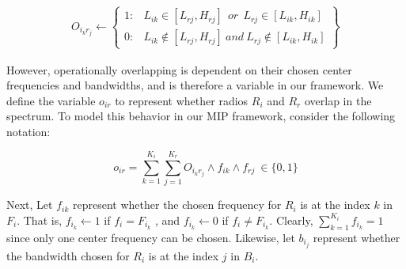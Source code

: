 
\vspace{-0.1in}
\begin{equation}
\begin{split}
O_{i_kr_j} \leftarrow 
\begin{Bmatrix}
1:& L_{ik} \in [L_{rj}, H_{rj}]~~or~~L_{rj} \in [L_{ik}, H_{ik}] \\
0:&  L_{ik} \notin [L_{rj}, H_{rj}]~and~L_{rj} \notin [L_{ik}, H_{ik}] 
\end{Bmatrix}
\end{split}
\end{equation}

However, operationally overlapping is dependent on their chosen center frequencies and bandwidths, and is therefore a variable in our framework. We define the variable $o_{ir}$ to represent whether radios $R_i$ and $R_r$ overlap in the spectrum.  To model this behavior in our MIP framework, consider the following notation:


\vspace{-0.1in}
\begin{equation}
\label{eq:oir}
o_{ir} = \sum_{k=1}^{K_i} \sum_{j=1}^{K_r} O_{i_kr_j} \wedge f_{ik} \wedge f_{rj}~ \in \{0,1\}
\end{equation}

Next, Let $f_{ik}$ represent whether the chosen frequency for $R_i$ is at the index $k$ in $F_i$.  That is, $f_{i_k} \leftarrow 1$ if $f_i = F_{i_k}$ , and $f_{i_k} \leftarrow 0$ if $f_i \ne F_{i_k}$.  Clearly, $\sum_{k=1}^{K_i} f_{i_k} = 1$ since only one center frequency can be chosen.  Likewise, let $b_{i_j}$ represent whether the bandwidth chosen for $R_i$ is at the index $j$ in $B_i$. 

